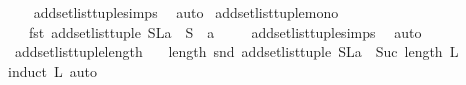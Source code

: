 \begin{isabellebody}
%
\isadelimproof
\ \ %
\endisadelimproof
%
\isatagproof
{}\isamarkupfalse%
\ add{\isacharunderscore}{\kern0pt}set{\isacharunderscore}{\kern0pt}list{\isacharunderscore}{\kern0pt}tuple{\isachardot}{\kern0pt}simps\ \isamarkupfalse%
\ auto%
\endisatagproof
{\isafoldproof}%
%
\isadelimproof
\isanewline
%
\endisadelimproof
\isanewline
{}\isamarkupfalse%
\ add{\isacharunderscore}{\kern0pt}set{\isacharunderscore}{\kern0pt}list{\isacharunderscore}{\kern0pt}tuple{\isacharunderscore}{\kern0pt}mono{}{\isacharcolon}{\kern0pt}\isanewline
\ \ \ {\isachardoublequoteopen}{\isacharparenleft}{\kern0pt}fst\ {\isacharparenleft}{\kern0pt}add{\isacharunderscore}{\kern0pt}set{\isacharunderscore}{\kern0pt}list{\isacharunderscore}{\kern0pt}tuple\ {\isacharparenleft}{\kern0pt}{\isacharparenleft}{\kern0pt}S{\isacharcomma}{\kern0pt}L{\isacharparenright}{\kern0pt}{\isacharcomma}{\kern0pt}a{\isacharparenright}{\kern0pt}{\isacharparenright}{\kern0pt}{\isacharparenright}{\kern0pt}\ {\isasymsubseteq}\ S\ {\isasymunion}\ {\isacharbraceleft}{\kern0pt}a{\isacharbraceright}{\kern0pt}\ {\isachardoublequoteclose}\isanewline
%
\isadelimproof
\ \ %
\endisadelimproof
%
\isatagproof
{}\isamarkupfalse%
\ add{\isacharunderscore}{\kern0pt}set{\isacharunderscore}{\kern0pt}list{\isacharunderscore}{\kern0pt}tuple{\isachardot}{\kern0pt}simps\ \isamarkupfalse%
\ auto%
\endisatagproof
{\isafoldproof}%
%
\isadelimproof
\isanewline
%
\endisadelimproof
\isanewline
{}\isamarkupfalse%
\ add{\isacharunderscore}{\kern0pt}set{\isacharunderscore}{\kern0pt}list{\isacharunderscore}{\kern0pt}tuple{\isacharunderscore}{\kern0pt}length{\isacharcolon}{\kern0pt}\isanewline
\ \ \ {\isachardoublequoteopen}length\ {\isacharparenleft}{\kern0pt}snd\ {\isacharparenleft}{\kern0pt}add{\isacharunderscore}{\kern0pt}set{\isacharunderscore}{\kern0pt}list{\isacharunderscore}{\kern0pt}tuple\ {\isacharparenleft}{\kern0pt}{\isacharparenleft}{\kern0pt}S{\isacharcomma}{\kern0pt}L{\isacharparenright}{\kern0pt}{\isacharcomma}{\kern0pt}a{\isacharparenright}{\kern0pt}{\isacharparenright}{\kern0pt}{\isacharparenright}{\kern0pt}\ {\isacharequal}{\kern0pt}\ Suc\ {\isacharparenleft}{\kern0pt}length\ L{\isacharparenright}{\kern0pt}{\isachardoublequoteclose}\isanewline
%
\isadelimproof
%
\endisadelimproof
%
\isatagproof
{}\isamarkupfalse%
{\isacharparenleft}{\kern0pt}induct\ L{\isacharcomma}{\kern0pt}\ auto{\isacharparenright}{\kern0pt}\ \isamarkupfalse%
%
\endisatagproof
{\isafoldproof}%

\end{isabellebody}
